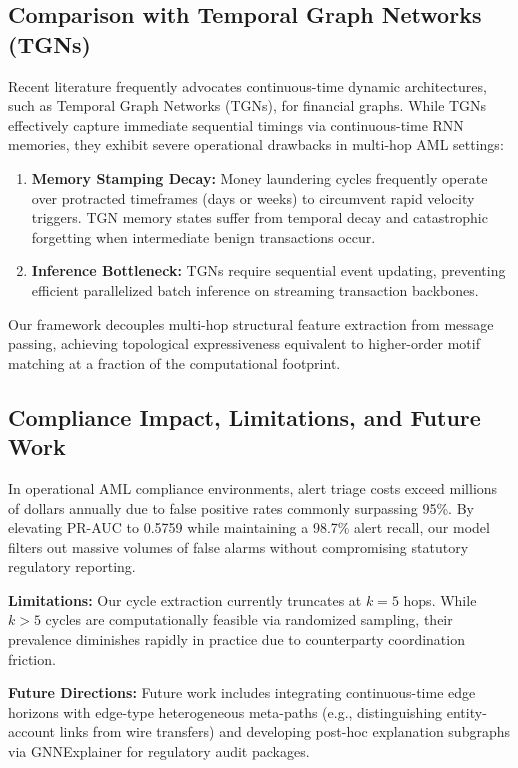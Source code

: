 \documentclass[10pt,twocolumn]{article}
\begin{document}
\subsection{Comparison with Temporal Graph Networks (TGNs)}
Recent literature frequently advocates continuous-time dynamic architectures, such as Temporal Graph Networks (TGNs), for financial graphs. While TGNs effectively capture immediate sequential timings via continuous-time RNN memories, they exhibit severe operational drawbacks in multi-hop AML settings:
\begin{enumerate}
    \item \textbf{Memory Stamping Decay:} Money laundering cycles frequently operate over protracted timeframes (days or weeks) to circumvent rapid velocity triggers. TGN memory states suffer from temporal decay and catastrophic forgetting when intermediate benign transactions occur.
    \item \textbf{Inference Bottleneck:} TGNs require sequential event updating, preventing efficient parallelized batch inference on streaming transaction backbones.
\end{enumerate}
Our framework decouples multi-hop structural feature extraction from message passing, achieving topological expressiveness equivalent to higher-order motif matching at a fraction of the computational footprint.

\subsection{Compliance Impact, Limitations, and Future Work}
In operational AML compliance environments, alert triage costs exceed millions of dollars annually due to false positive rates commonly surpassing 95\%. By elevating PR-AUC to 0.5759 while maintaining a 98.7\% alert recall, our model filters out massive volumes of false alarms without compromising statutory regulatory reporting. 

\textbf{Limitations:} Our cycle extraction currently truncates at $k=5$ hops. While $k > 5$ cycles are computationally feasible via randomized sampling, their prevalence diminishes rapidly in practice due to counterparty coordination friction. 

\textbf{Future Directions:} Future work includes integrating continuous-time edge horizons with edge-type heterogeneous meta-paths (e.g., distinguishing entity-account links from wire transfers) and developing post-hoc explanation subgraphs via GNNExplainer for regulatory audit packages.
\end{document}
